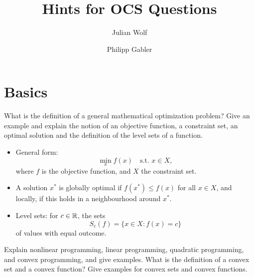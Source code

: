 \documentclass{article}
\title{Hints for OCS Questions}
\author{Julian Wolf \and Philipp Gabler}
\begin{document}
\maketitle

\section{Basics}

\begin{question}
  What is the definition of a general mathematical optimization problem?  Give an example and
  explain the notion of an objective function, a constraint set, an optimal solution and the
  definition of the level sets of a function.
\end{question}
\begin{itemize}
\item General form:
  \begin{equation*}
    \min_{x} f(x) \quad \text{s.t. } x \in X,
  \end{equation*}
  where \(f\) is the objective function, and \(X\) the constraint set.
\item A solution \(x^*\) is globally optimal if \(f(x^*) \leq f(x)\) for all \(x \in X\), and
  locally, if this holds in a neighbourhood around \(x^*\).
\item Level sets: for \(c \in \mathbb{R}\), the sets
  \begin{equation*}
    S_c(f) = \{x \in X: f(x) = c\}
  \end{equation*}
  of values with equal outcome.
\end{itemize}

\begin{question}
  Explain nonlinear programming, linear programming, quadratic programming, and convex programming,
  and give examples. What is the definition of a convex set and a convex function? Give examples for
  convex sets and convex functions.
\end{question}
\end{document}
